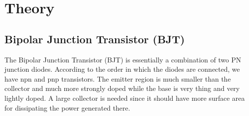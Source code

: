 \section{Theory}


\subsection{Bipolar Junction Transistor (BJT)}
The Bipolar Junction Transistor (BJT) is essentially a combination of two PN junction diodes.  According to the order in which the diodes are connected, we have npn and pnp transistors. The emitter region is much smaller than the collector and much more strongly doped while the base is very thing and very lightly doped. A large collector is needed since it should have more surface area for dissipating the power generated there.\\[0.3cm]
